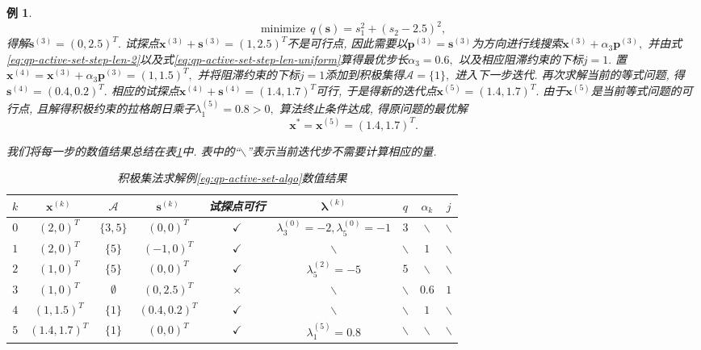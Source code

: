 \documentclass{SBCbookchapter}
\newcommand{\V}[1]{{\bm{#1}}}
\newtheorem{eg}[thm]{例}
\numberwithin{equation}{section}
\begin{document}
\begin{eg}
\begin{equation*}
\text{minimize} ~~ q(\V{s}) = s_1^2 + (s_2 - 2.5)^2,
\end{equation*}
得解$\V{s}^{(3)} = (0, 2.5)^T.$ 试探点$\V{x}^{(3)} + \V{s}^{(3)} = (1, 2.5)^T$不是可行点, 因此需要以$\V{p}^{(3)} = \V{s}^{(3)}$为方向进行线搜索$\V{x}^{(3)} + \alpha_3 \V{p}^{(3)},$ 并由式\eqref{eq:qp-active-set-step-len-2}以及式\eqref{eq:qp-active-set-step-len-uniform}算得最优步长$\alpha_3 = 0.6,$ 以及相应阻滞约束的下标$j = 1.$ 置$\V{x}^{(4)} = \V{x}^{(3)} + \alpha_3 \V{p}^{(3)} = (1, 1.5)^T,$ 并将阻滞约束的下标$j = 1$添加到积极集得$\mathcal{A} = \{ 1 \},$ 进入下一步迭代. 再次求解当前的等式问题, 得$\V{s}^{(4)} = (0.4, 0.2)^T.$ 相应的试探点$\V{x}^{(4)} + \V{s}^{(4)} = (1.4, 1.7)^T$可行, 于是得新的迭代点$\V{x}^{(5)} = (1.4, 1.7)^T.$ 由于$\V{x}^{(5)}$是当前等式问题的可行点, 且解得积极约束的拉格朗日乘子$\lambda_1^{(5)} = 0.8 > 0,$ 算法终止条件达成, 得原问题的最优解
\begin{equation*}
\V{x}^* = \V{x}^{(5)} = (1.4, 1.7)^T.
\end{equation*}

我们将每一步的数值结果总结在表\ref{tab:active-set-eg}中. 表中的``$\backslash$''表示当前迭代步不需要计算相应的量.

\begin{table}[H]
    \caption{积极集法求解例\ref{eg:qp-active-set-algo}数值结果}
    \label{tab:active-set-eg}
    \centering
    \begin{tabular}{ccccccccc}
    \hline
    $k$ & $\V{x}^{(k)}$ & $\mathcal{A}$ & $\V{s}^{(k)}$ & 试探点可行 & $\V{\lambda}^{(k)}$ & $q$ & $\alpha_k$ & $j$ \\
    \hline
    $0$ & $(2, 0)^T$ & $\{ 3, 5 \}$ & $(0, 0)^T$ & $\checkmark$ & $\lambda_3^{(0)} = -2, \lambda_5^{(0)} = -1$ & $3$ & $\backslash$ & $\backslash$ \\
    $1$ & $(2, 0)^T$ & $\{ 5 \}$ & $(-1, 0)^T$ & $\checkmark$ & $\backslash$ & $\backslash$ & $1$ & $\backslash$ \\
    $2$ & $(1, 0)^T$ & $\{ 5 \}$ & $(0, 0)^T$ & $\checkmark$ & $\lambda_5^{(2)} = -5$ & $5$ & $\backslash$ & $\backslash$ \\
    $3$ & $(1, 0)^T$ & $\emptyset$ & $(0, 2.5)^T$ & $\times$ & $\backslash$ & $\backslash$ & $0.6$ & $1$ \\
    $4$ & $(1, 1.5)^T$ & $\{ 1 \}$ & $(0.4, 0.2)^T$ & $\checkmark$ & $\backslash$ & $\backslash$ & $1$ & $\backslash$ \\
    $5$ & $(1.4, 1.7)^T$ & $\{ 1 \}$ & $(0, 0)^T$ & $\checkmark$ & $\lambda_1^{(5)} = 0.8$ & $\backslash$ & $\backslash$ & $\backslash$ \\
    \hline
    \end{tabular}
\end{table}
\end{eg}
\end{document}

